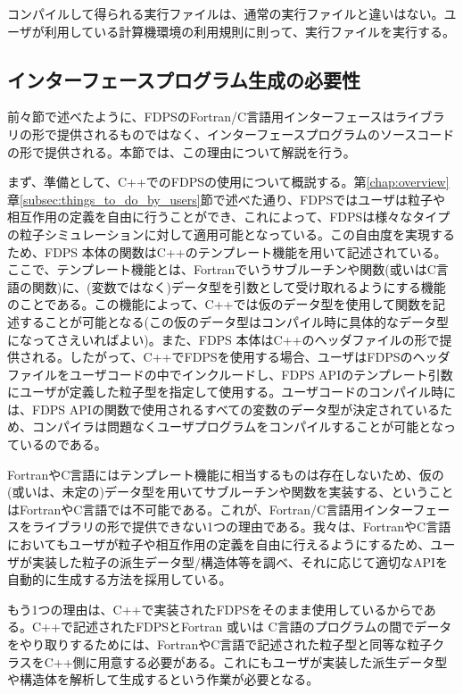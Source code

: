 \begin{enumerate}[leftmargin=*,label={[\arabic*]}]
 コンパイルして得られる実行ファイルは、通常の実行ファイルと違いはない。ユーザが利用している計算機環境の利用規則に則って、実行ファイルを実行する。
\end{enumerate}

\subsection{インターフェースプログラム生成の必要性}
\label{subsec:reasons_for_autogen_ftn_if}
前々節で述べたように、FDPSのFortran/C言語用インターフェースはライブラリの形で提供されるものではなく、インターフェースプログラムのソースコードの形で提供される。本節では、この理由について解説を行う。

まず、準備として、C++でのFDPSの使用について概説する。第\ref{chap:overview}章\ref{subsec:things_to_do_by_users}節で述べた通り、FDPSではユーザは粒子や相互作用の定義を自由に行うことができ、これによって、FDPSは様々なタイプの粒子シミュレーションに対して適用可能となっている。この自由度を実現するため、FDPS 本体の関数はC++のテンプレート機能を用いて記述されている。ここで、テンプレート機能とは、Fortranでいうサブルーチンや関数(或いはC言語の関数)に、(変数ではなく)データ型を引数として受け取れるようにする機能のことである。この機能によって、C++では仮のデータ型を使用して関数を記述することが可能となる(この仮のデータ型はコンパイル時に具体的なデータ型になってさえいればよい)。また、FDPS 本体はC++のヘッダファイルの形で提供される。したがって、C++でFDPSを使用する場合、ユーザはFDPSのヘッダファイルをユーザコードの中でインクルードし、FDPS APIのテンプレート引数にユーザが定義した粒子型を指定して使用する。ユーザコードのコンパイル時には、FDPS APIの関数で使用されるすべての変数のデータ型が決定されているため、コンパイラは問題なくユーザプログラムをコンパイルすることが可能となっているのである。

FortranやC言語にはテンプレート機能に相当するものは存在しないため、仮の(或いは、未定の)データ型を用いてサブルーチンや関数を実装する、ということはFortranやC言語では不可能である。これが、Fortran/C言語用インターフェースをライブラリの形で提供できない1つの理由である。我々は、FortranやC言語においてもユーザが粒子や相互作用の定義を自由に行えるようにするため、ユーザが実装した粒子の派生データ型/構造体等を調べ、それに応じて適切なAPIを自動的に生成する方法を採用している。

もう1つの理由は、C++で実装されたFDPSをそのまま使用しているからである。C++で記述されたFDPSとFortran 或いは C言語のプログラムの間でデータをやり取りするためには、FortranやC言語で記述された粒子型と同等な粒子クラスをC++側に用意する必要がある。これにもユーザが実装した派生データ型や構造体を解析して生成するという作業が必要となる。

